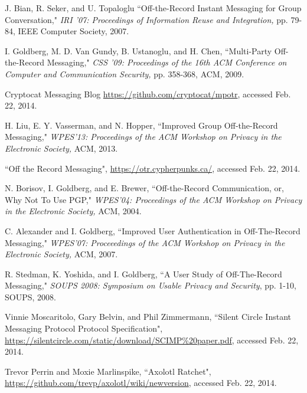 \documentclass[%
preprint,
amsmath,amssymb,
aps,
prb,
floatfix,
]{revtex4-1}
\begin{document}
\begin{thebibliography}{99}
 J. Bian, R. Seker, and U. Topaloglu ``Off-the-Record Instant
Messaging for Group Conversation," \textit{IRI '07: Proceedings of Information
Reuse and Integration,} pp. 79-84, IEEE Computer Society, 2007.

 I. Goldberg, M. D. Van Gundy, B. Ustanoglu, and H. Chen,
``Multi-Party Off-the-Record Messaging," \textit{CSS '09: Proceedings of the
16th ACM Conference on Computer and Communication Security,} pp. 358-368, ACM,
2009.

 Cryptocat Messaging Blog
\url{https://github.com/cryptocat/mpotr}, accessed Feb. 22, 2014.

 H. Liu, E. Y. Vasserman, and N. Hopper, ``Improved Group
Off-the-Record Messaging," \textit{WPES'13: Proceedings of the ACM Workshop on
Privacy in the Electronic Society,} ACM, 2013.

 ``Off the Record Messaging",
\url{https://otr.cypherpunks.ca/}, accessed Feb. 22, 2014.

 N. Borisov, I. Goldberg, and E. Brewer, ``Off-the-Record
Communication, or, Why Not To Use PGP," \textit{WPES'04: Proceedings of the
ACM Workshop on Privacy in the Electronic Society,} ACM, 2004.

 C. Alexander and I. Goldberg, ``Improved User Authentication
in Off-The-Record Messaging," \textit{WPES'07: Proceeedings of the ACM Workshop
on Privacy in the Electronic Society,} ACM, 2007.

 R. Stedman, K. Yoshida, and I. Goldberg, ``A User Study of
Off-The-Record Messaging," \textit{SOUPS 2008: Symposium on Usable Privacy and
Security}, pp. 1-10, SOUPS, 2008.

  Vinnie Moscaritolo, Gary Belvin, and Phil Zimmermann,
``Silent Circle Instant Messaging Protocol Protocol Specification",
\url{https://silentcircle.com/static/download/SCIMP%20paper.pdf}, accessed Feb.
22, 2014.

 Trevor Perrin and Moxie Marlinspike, ``Axolotl Ratchet",
\url{https://github.com/trevp/axolotl/wiki/newversion}, accessed Feb. 22, 2014.

\end{thebibliography}
\end{document}
